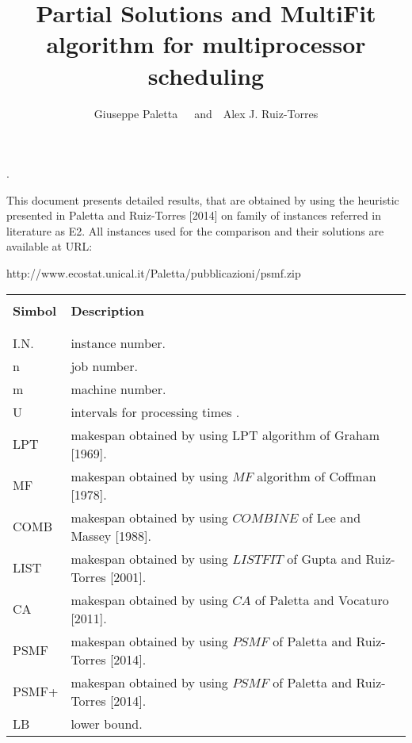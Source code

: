 \documentclass[12pt,a4paper]{article}
\title{\bf
Partial Solutions and MultiFit algorithm for multiprocessor
scheduling}
\author{Giuseppe Paletta\footnotemark[1]~~~and~~Alex J. Ruiz-Torres \footnotemark[2]}
\begin{document}
\maketitle

\renewcommand{\thefootnote}{\fnsymbol{footnote}}

. 
\renewcommand{\thefootnote}{\fnsymbol{footnote}}

This document presents detailed results, that are obtained by using
the heuristic presented in Paletta and Ruiz-Torres [2014] on family
of instances referred in literature as E2. All instances used for
the comparison and their solutions are available at URL:
\begin{center}
http://www.ecostat.unical.it/Paletta/pubblicazioni/psmf.zip
\end{center}

\begin{tabular}{l l}\hline
        &  \\[0.03in]
{\bf Simbol} &  {\bf Description} \\[0.03in]
        &  \\[0.03in]\hline
        &  \\[0.03in]
I.N.  & instance number. \\[0.03in]
n       & job number.    \\[0.03in]
m       & machine number. \\[0.03in]
U       & intervals for processing times . \\[0.03in]
LPT      & makespan obtained by using LPT algorithm of Graham [1969]. \\[0.03in]
MF      & makespan obtained by using $MF$ algorithm of Coffman [1978].\\[0.03in]
COMB      & makespan obtained by using $COMBINE$ of Lee and Massey [1988]. \\[0.03in]
LIST      & makespan obtained by using $LISTFIT$ of Gupta and Ruiz-Torres [2001]. \\[0.03in]
CA      & makespan obtained by using  $CA$ of Paletta and Vocaturo [2011].\\[0.03in]
PSMF      & makespan obtained by using  $PSMF$ of Paletta and Ruiz-Torres [2014]. \\[0.03in]
PSMF+     & makespan obtained by using $PSMF$ of Paletta and Ruiz-Torres [2014]. \\[0.03in]
LB      & lower bound. \\[0.03in]

\end{tabular}
\end{document}
